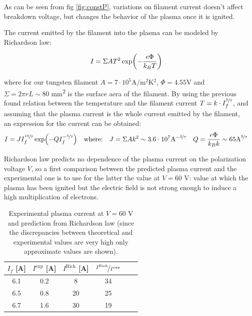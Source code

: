 \documentclass[11pt,a4 paper]{article}
\let\oldfrac\frac
\renewcommand{\frac}[3][d]{\ifthenelse{\equal{#1}{d}}{\oldfrac{#2}{#3}}{\nicefrac{#2}{#3}}}
\begin{document}
As can be seen from fig \ref{fig:constP}, variations on filament current doesn't affect breakdown voltage, but changes the behavior of the plasma once it is ignited.

The current emitted by the filament into the plasma can be modeled by Richardson law:

\begin{equation*}
  I = \Sigma A T^2 \exp(-\frac{e\Phi}{k_BT})
\end{equation*}

where for our tungsten filament $A = 7\cdot 10^5 \si{\ampere/\metre^2\kelvin^2}$, $\Phi =  4.55 \si{\volt}$ and $\Sigma = 2\pi r L \sim 80$ \si{\milli\metre^2} is the surface aera of the filament. By using the previous found relation between the temperature and the filament current $T = k\cdot I_f^{\frac[f]{5}{7}}$, and assuming that the plasma current is the whole current emitted by the filament, an expression for the current can be obtained:
\begin{gather*}
  I = JI_f^{\frac[f]{10}{7}}\exp(-QI_f^{-\frac[f]{5}{7}}) \quad\text{where:}\quad
  J = \Sigma A k^2 \sim 3.6 \cdot 10^7 \text{A}^{-\frac[f]{3}{7}} \quad
  Q = \frac{e\Phi}{k_Bk} \sim 65 \text{A}^{\frac[f]{5}{7}}
\end{gather*}

Richardson law predicts no dependence of the plasma current on the polarization voltage $V$, so a first comparison between the predicted plasma current and the experimental one is to use for the latter the value at $V = 60$ \si{\volt}: value at which the plasma has been ignited but the electric field is not strong enough to induce a high multiplication of electrons.

\begin{table}[H]
  \centering
  \begin{tabular}{cccccc}
    \toprule
    $I_f$ [\si{\ampere}] & $I^{\text{exp}}$ [\si{\ampere}] & $I^{\text{Rich}}$ [\si{\ampere}]  & $\frac[f]{I^{\text{Rich}}}{I^{\text{exp}}}$\\
    \midrule
    6.1 & 0.2 & 8 & 34 \\
    6.5 & 0.8 & 20 & 25 \\
    6.7 & 1.6 & 30 & 19 \\
    \bottomrule
  \end{tabular}
  \caption{Experimental plasma current at $V = 60$ \si{\volt} and prediction from Richardson law (since the discrepancies between theoretical and experimental values are very high only approximate values are shown).}
  \label{tab:Richardson}
\end{table}
\end{document}

